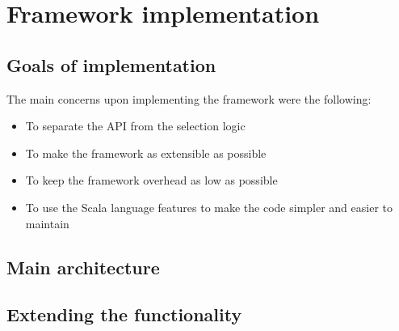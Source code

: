 \chapter{Framework implementation}

\section{Goals of implementation}

The main concerns upon implementing the framework were the following:

\begin{itemize}
	\item To separate the API from the selection logic
	\item To make the framework as extensible as possible
	\item To keep the framework overhead as low as possible
	\item To use the Scala language features to make the code simpler and easier to maintain
\end{itemize}

\section{Main architecture}
\section{Extending the functionality}
